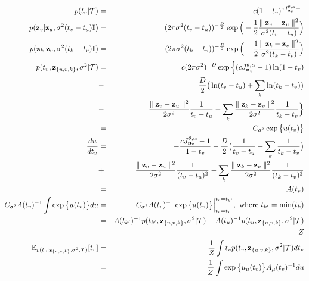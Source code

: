 \documentclass{article}
\begin{document}
	\begin{eqnarray}
	p(t_v | \mathcal{T}) &=& c(1-t_v)^{cJ^{\theta,\alpha}_{\bold{n}_v} - 1} \\
	p(\bold{z}_v | \bold{z}_u, \sigma^2(t_v - t_u)\bold{I}) &=& (2 \pi \sigma^2(t_v - t_u))^{-\frac{D}{2}} \exp \Big(-\frac{1}{2}\frac{\parallel \bold{z}_v - \bold{z}_u \parallel^2}{\sigma^2 (t_v - t_u)} \Big)\\
	p(\bold{z}_k | \bold{z}_v, \sigma^2(t_k - t_v)\bold{I}) &=& (2 \pi \sigma^2(t_k - t_v))^{-\frac{D}{2}} \exp \Big(-\frac{1}{2}\frac{\parallel \bold{z}_k - \bold{z}_v \parallel^2}{\sigma^2 (t_k - t_v)} \Big)\\
	p(t_v, \bold{z}_{\{u,v,k\}}, \sigma^2 | \mathcal{T}) & = & c(2 \pi \sigma^2)^{-D}\exp \Big\{(cJ^{\theta,\alpha}_{\bold{n}_v} - 1)\ln(1 - t_v) \nonumber \\
	 &-& \frac{D}{2} \big( \ln(t_v - t_u) + \sum_k \ln(t_k - t_v) \big) \nonumber \\
	 &-& \frac{\parallel \bold{z}_v - \bold{z}_u\parallel^2}{2\sigma^2}\frac{1}{t_v - t_u} - \sum_k \frac{\parallel \bold{z}_k - \bold{z}_v\parallel^2}{2\sigma^2}\frac{1}{t_k - t_v} \Big\}  \nonumber\\
	 &=& C_{\sigma^2} \exp \big\{ u(t_v) \big\}\\
	\frac{du}{dt_v} &=& -\frac{cJ^{\theta,\alpha}_{\bold{n}_v} - 1}{1 - t_v} - \frac{D}{2}\big( \frac{1}{t_v - t_u} - \sum_k\frac{1}{t_k - t_v}\big) \nonumber \\
	 &+& \frac{\parallel \bold{z}_v - \bold{z}_u\parallel^2}{2\sigma^2}\frac{1}{(t_v - t_u)^2} - \sum_k \frac{\parallel \bold{z}_k - \bold{z}_v\parallel^2}{2\sigma^2}\frac{1}{(t_k - t_v)^2} \nonumber \\
	 &=& A(t_v)\\
	 C_{\sigma^2} A(t_v)^{-1} \int \exp \big\{u(t_v)\big\}du &=& C_{\sigma^2} A(t_v)^{-1} \exp \big\{u(t_v)\big\}\Big\vert^{t_v = t_{k'}}_{t_v = t_u} ,\textrm{ where } t_{k'} = \min(t_k) \nonumber \\
	 &=& A(t_{k'})^{-1}p(t_{k'}, \bold{z}_{\{u,v,k\}}, \sigma^2 | \mathcal{T}) - A(t_{u})^{-1}p(t_{u}, \bold{z}_{\{u,v,k\}}, \sigma^2 | \mathcal{T})\nonumber \\
	 &=& Z \\
	\mathbb{E}_{p(t_v | \bold{z}_{\{u,v,k\}}, \sigma^2, \mathcal{T})}[t_v] &=& \frac{1}{Z} \int t_v p(t_v, \bold{z}_{\{u,v,k\}}, \sigma^2 | \mathcal{T}) dt_v \nonumber \\
	&=& \frac{1}{Z} \int \exp \big\{ u_\mu(t_v)\big\}A_\mu(t_v)^{-1}du
	\end{eqnarray}
	
\end{document}

